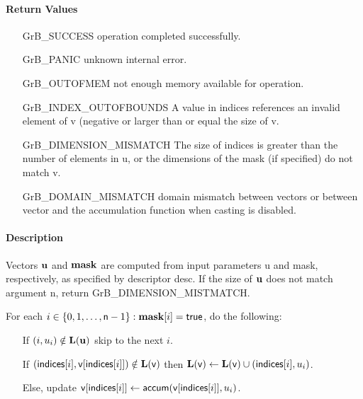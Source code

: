 \paragraph{Return Values}


\begin{itemize}[leftmargin=2.1in]
\item[{\sf GrB\_SUCCESS}]      operation completed successfully.
\item[{\sf GrB\_PANIC}]        unknown internal error.
\item[{\sf GrB\_OUTOFMEM}]     not enough memory available for operation.
\item[{\sf GrB\_INDEX\_OUTOFBOUNDS}]
        A value in {\sf indices} references an invalid element of {\sf v} (negative or larger than or equal the size of {\sf v}.
\item[{\sf GrB\_DIMENSION\_MISMATCH}] 
        The size of {\sf indices} is greater than the number of elements in {\sf u}, or
        the dimensions of the mask (if specified) do not match {\sf v}.
\item[\sf GrB\_DOMAIN\_MISMATCH]  
       domain mismatch between vectors or between vector and the accumulation function when casting is disabled.
\end{itemize}

\paragraph{Description}

Vectors ${\bf u}$ and ${\bf mask}$ are computed from input parameters {\sf u} and {\sf mask}, respectively, as specified by descriptor {\sf desc}. If
the size of ${\bf u}$ does not match argument {\sf n}, return {\sf GrB\_DIMENSION\_MISTMATCH}.

For each $i \in \{0, 1, \ldots, {\sf n}-1 \} : {\bf mask}[i] = {\sf true}$, do the following:
\begin{itemize}
	\item[] If $(i, u_i) \notin \bold{L}({\bf u})$ skip to the next $i$.
	\item[] If $({\sf indices}[i], {\sf v}[{\sf indices}[i]]) \notin \bold{L}({\sf v})$ then
	      $\bold{L}({\sf v}) \leftarrow \bold{L}({\sf v}) \cup ({\sf indices}[i],u_i)$.
	\item[] Else, update ${\sf v}[{\sf indices}[i]] \leftarrow {\sf accum}({\sf v}[{\sf indices}[i]],u_i)$.
\end{itemize}


